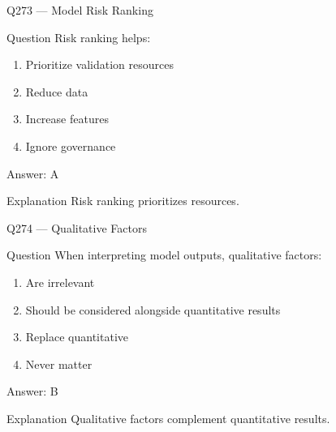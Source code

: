 \documentclass[aspectratio=169,8pt]{beamer}
\begin{document}
								\begin{frame}{Q273 --- Model Risk Ranking}
									\begin{block}{Question}
										Risk ranking helps:
										\begin{enumerate}
											\item Prioritize validation resources
											\item Reduce data
											\item Increase features
											\item Ignore governance
										\end{enumerate}
									\end{block}
									\begin{exampleblock}{Answer: A}\end{exampleblock}
									\begin{block}{Explanation}
										Risk ranking prioritizes resources.
									\end{block}
								\end{frame}
								
								\begin{frame}{Q274 --- Qualitative Factors}
									\begin{block}{Question}
										When interpreting model outputs, qualitative factors:
										\begin{enumerate}
											\item Are irrelevant
											\item Should be considered alongside quantitative results
											\item Replace quantitative
											\item Never matter
										\end{enumerate}
									\end{block}
									\begin{exampleblock}{Answer: B}\end{exampleblock}
									\begin{block}{Explanation}
										Qualitative factors complement quantitative results.
									\end{block}
								\end{frame}
								
\end{document}
